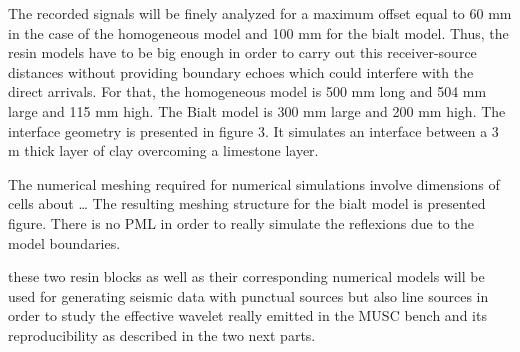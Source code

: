 \documentclass[manuscript,revised]{geophysics}
\begin{document}
\noindent The recorded signals will be finely analyzed for a maximum offset equal to 60 mm in the case of the homogeneous model and 100 mm for the bialt model. Thus, the resin models have to be big enough in order to carry out this receiver-source distances without providing boundary echoes which could interfere with the direct arrivals. For that, the homogeneous model is 500 mm long and 504 mm large and 115 mm high. The Bialt model is 300 mm large and 200 mm high. The interface geometry is presented in figure 3. It simulates an interface between a 3 m thick layer of clay overcoming a limestone layer.

\noindent The numerical meshing required for numerical simulations involve dimensions of cells about … The resulting meshing structure for the bialt model is presented figure.
There is no PML in order to really simulate the reflexions due to the model boundaries.

these two resin blocks as well as their corresponding numerical models will be used for generating seismic data with punctual sources but also line sources in order to study the effective wavelet really emitted in the MUSC bench and its reproducibility as described in the two next parts.

\end{document}
